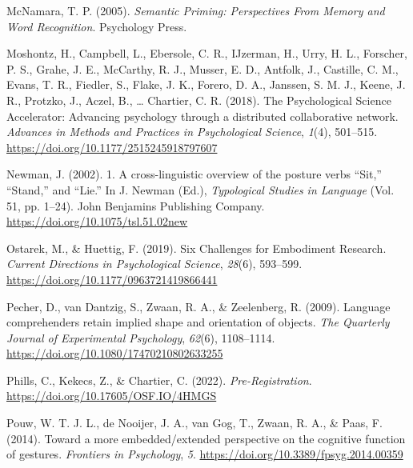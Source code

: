 \documentclass[
  man,floatsintext]{apa7}
\newlength{\cslhangindent}
\newlength{\cslentryspacingunit} %
\newenvironment{CSLReferences}[2] %
 {%
  \setlength{\parindent}{0pt}
  \ifodd #1
  \let\oldpar\par
  \def\par{\hangindent=\cslhangindent\oldpar}
  \fi
  \setlength{\parskip}{#2\cslentryspacingunit}
 }%
 {}
\begin{document}
\begin{CSLReferences}{1}{0}
\leavevmode{}%
McNamara, T. P. (2005). \emph{Semantic {Priming}: {Perspectives From Memory} and {Word Recognition}}. {Psychology Press}.

\leavevmode{}%
Moshontz, H., Campbell, L., Ebersole, C. R., IJzerman, H., Urry, H. L., Forscher, P. S., Grahe, J. E., McCarthy, R. J., Musser, E. D., Antfolk, J., Castille, C. M., Evans, T. R., Fiedler, S., Flake, J. K., Forero, D. A., Janssen, S. M. J., Keene, J. R., Protzko, J., Aczel, B., \ldots{} Chartier, C. R. (2018). The {Psychological Science Accelerator}: {Advancing} psychology through a distributed collaborative network. \emph{Advances in Methods and Practices in Psychological Science}, \emph{1}(4), 501--515. \url{https://doi.org/10.1177/2515245918797607}

\leavevmode{}%
Newman, J. (2002). 1. {A} cross-linguistic overview of the posture verbs {``{Sit},''} {``{Stand},''} and {``{Lie}.''} In J. Newman (Ed.), \emph{Typological {Studies} in {Language}} (Vol. 51, pp. 1--24). {John Benjamins Publishing Company}. \url{https://doi.org/10.1075/tsl.51.02new}

\leavevmode{}%
Ostarek, M., \& Huettig, F. (2019). Six {Challenges} for {Embodiment Research}. \emph{Current Directions in Psychological Science}, \emph{28}(6), 593--599. \url{https://doi.org/10.1177/0963721419866441}

\leavevmode{}%
Pecher, D., van Dantzig, S., Zwaan, R. A., \& Zeelenberg, R. (2009). Language comprehenders retain implied shape and orientation of objects. \emph{The Quarterly Journal of Experimental Psychology}, \emph{62}(6), 1108--1114. \url{https://doi.org/10.1080/17470210802633255}

\leavevmode{}%
Phills, C., Kekecs, Z., \& Chartier, C. (2022). \emph{Pre-{Registration}}. \url{https://doi.org/10.17605/OSF.IO/4HMGS}

\leavevmode{}%
Pouw, W. T. J. L., de Nooijer, J. A., van Gog, T., Zwaan, R. A., \& Paas, F. (2014). Toward a more embedded/extended perspective on the cognitive function of gestures. \emph{Frontiers in Psychology}, \emph{5}. \url{https://doi.org/10.3389/fpsyg.2014.00359}


\end{CSLReferences}
\end{document}
